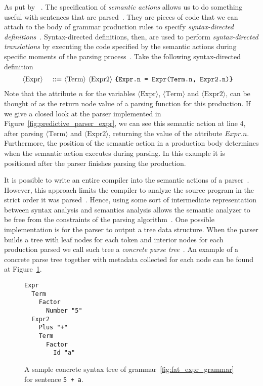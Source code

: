 \documentclass[
  oneside,
  english,
  coorientadorbanca,
  embeddedlogo,
  noabntexcite
]{ufsc-thesis-rn46-2019}
\newcommand{\bnfvar}[1]{\ \bnfvars{#1}}
\newcommand{\bnfvars}[1]{\langle\textrm{#1}\rangle}
\newcommand{\bnfprod}[2]{\bnfvars{#1} &\ &::= & #2}
\begin{document}
As put by~\textcite{appel2003modern} .
The specification of \textit{semantic actions} allows us to do something useful with sentences that are parsed~\cite{appel2003modern}.
They are pieces of code that we can attach to the body of grammar production rules to specify \textit{syntax-directed definitions}~\cite{Aho:2006:CPT:1177220}.
Syntax-directed definitions, then, are used to perform \textit{syntax-directed translations} by executing the code specified by the semantic actions during specific moments of the parsing process~\cite{Aho:2006:CPT:1177220}.
Take the following syntax-directed definition
\begin{alignat}{2}
  \bnfprod{Expr}{\bnfvar{Term} \bnfvar{Expr2}\ \text{\texttt{\{Expr.n = Expr(Term.n, Expr2.n)\}}}} \label{eq:sdd_example}
\end{alignat}
Note that the attribute $n$ for the variables $\bnfvars{Expr}$, $\bnfvars{Term}$ and $\bnfvars{Expr2}$, can be thought of as the return node value of a parsing function for this production.
If we give a closed look at the parser implemented in Figure~\ref{fig:predictive_parser_expr}, we can see this semantic action at line 4, after parsing $\bnfvars{Term}$ and $\bnfvars{Expr2}$, returning the value of the attribute $Expr.n$.
Furthermore, the position of the semantic action in a production body determines when the semantic action executes during parsing.
In this example it is positioned after the parser finishes parsing the production.

It is possible to write an entire compiler into the semantic actions of a parser~\cite{appel2003modern}.
However, this approach limits the compiler to analyze the source program in the strict order it was parsed~\cite{appel2003modern}.
Hence, using some sort of intermediate representation between syntax analysis and semantics analysis allows the semantic analyzer to be free from the constraints of the parsing algorithm~\cite{appel2003modern}.
One possible implementation is for the parser to output a tree data structure.
When the parser builds a tree with leaf nodes for each token and interior nodes for each production parsed we call such tree a \textit{concrete parse tree}~\cite{appel2003modern}.
An example of a concrete parse tree together with metadata collected for each node can be found at Figure~\ref{fig:concrete_syntax_tree}.

\begin{figure}[ht]
  \centering
  \begin{minipage}{0.5\textwidth}
    \begin{verbatim}
Expr
  Term
    Factor
      Number "5"
  Expr2
    Plus "+"
    Term
      Factor
        Id "a"
    \end{verbatim}
  \end{minipage}
  \caption{
    A sample concrete syntax tree of grammar~\ref{fig:fat_expr_grammar} for sentence \texttt{5 + a}.
  }\label{fig:concrete_syntax_tree}
\end{figure}
\end{document}
